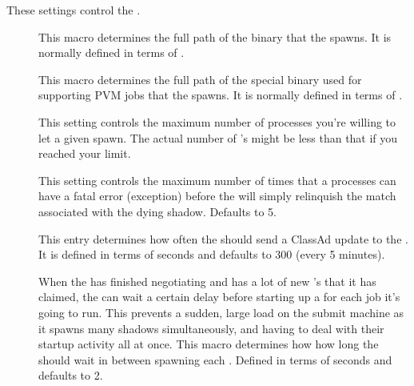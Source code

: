 These settings control the .

\begin{description}

\item[] \label{param:Shadow} This macro determines the
  full path of the  binary that the 
  spawns.  It is normally defined in terms of . 
  
\item[] \label{param:ShadowPvm} This macro
  determines the full path of the special  binary
  used for supporting PVM jobs that the  spawns.  It is
  normally defined in terms of .

\item[] \label{param:MaxJobsRunning} This
  setting controls the maximum number of  processes
  you're willing to let a given  spawn.  The actual
  number of 's might be less than that if you reached
  your  limit.

\item[]
  \label{param:MaxShadowExceptions} This setting controls the maximum
  number of times that a  processes can have a fatal
  error (exception) before the  will simply relinquish
  the match associated with the dying shadow.  Defaults to 5.

\item[] \label{param:ScheddInterval}  This
  entry determines how often the  should send a ClassAd
  update to the .  It is defined in terms of seconds
  and defaults to 300 (every 5 minutes).
  
\item[] \label{param:JobStartDelay} When the
   has finished negotiating and has a lot of new
  's that it has claimed, the  can wait
  a certain delay before starting up a  for each job
  it's going to run.  This prevents a sudden, large load on the submit
  machine as it spawns many shadows simultaneously, and having to deal
  with their startup activity all at once.  This macro determines how
  how long the  should wait in between spawning each
  .  Defined in terms of seconds and defaults to 2. 
  

\end{description}
